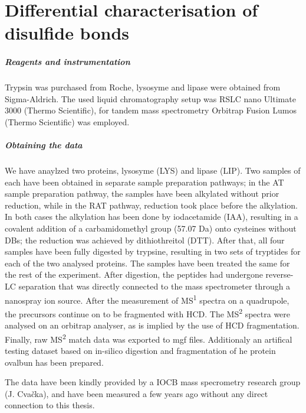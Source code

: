 \chapter{Differential characterisation of disulfide bonds}\label{chap:methods}


\paragraph{Reagents and instrumentation} Trypsin was purchased from Roche, lysosyme and lipase were obtained from Sigma-Aldrich. The used liquid chromatography setup was RSLC nano Ultimate 3000 (Thermo Scientific), for tandem mass spectrometry Orbitrap Fusion Lumos (Thermo Scientific) was employed.

\paragraph{Obtaining the data} We have anaylzed two proteins, lysosyme (LYS) and lipase (LIP). Two samples of each have been obtained in separate sample preparation pathways; in the AT sample preparation pathway, the samples have been alkylated without prior reduction, while in the RAT pathway, reduction took place before the alkylation. In both cases the alkylation has been done by iodacetamide (IAA), resulting in a covalent addition of a carbamidomethyl group (57.07 Da) onto cysteines without DBs; the reduction was achieved by dithiothreitol (DTT). After that, all four samples have been fully digested by trypsine, resulting in two sets of tryptides for each of the two analysed proteins. The samples have been treated the same for the rest of the experiment. After digestion, the peptides had undergone reverse-LC separation that was directly connected to the mass spectrometer through a nanospray ion source. After the measurement of MS\textsuperscript{1} spectra on a quadrupole, the precursors continue on to be fragmented with HCD\@. The MS\textsuperscript{2} spectra were analysed on an orbitrap analyser, as is implied by the use of HCD fragmentation. Finally, raw MS\textsuperscript{2} match data was exported to mgf files. Additionaly an artifical testing dataset based on in-silico digestion and fragmentation of he protein ovalbun has been prepared.

The data have been kindly provided by a IOCB mass specrometry research group (J. Cvačka), and have been measured a few years ago without any direct connection to this thesis.


